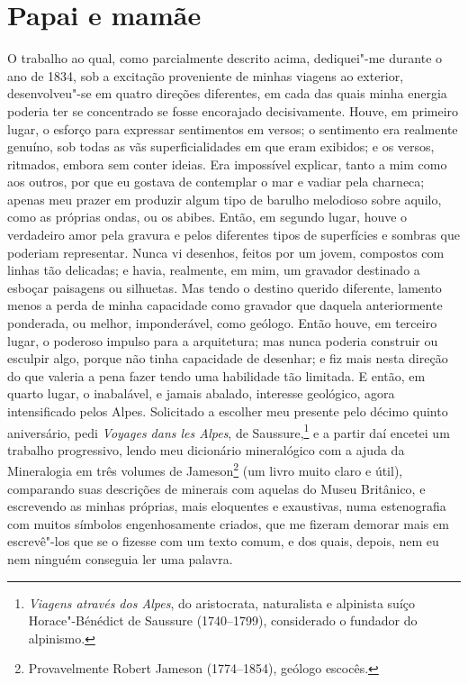 \chapter{Papai e mamãe} %

O trabalho ao qual, como parcialmente descrito acima, dediquei"-me \label{139}
durante o ano de 1834, sob a excitação proveniente de minhas viagens ao
exterior, desenvolveu"-se em quatro direções diferentes, em cada das
quais minha energia poderia ter se concentrado se fosse encorajado
decisivamente. Houve, em primeiro lugar, o esforço para expressar
sentimentos em versos; o sentimento era realmente genuíno, sob todas as
vãs superficialidades em que eram exibidos; e os versos, ritmados,
embora sem conter ideias. Era impossível explicar, tanto a mim como aos
outros, por que eu gostava de contemplar o mar e vadiar pela charneca;
apenas meu prazer em produzir algum tipo de barulho melodioso sobre
aquilo, como as próprias ondas, ou os abibes. Então, em segundo lugar,
houve o verdadeiro amor pela gravura e pelos diferentes tipos de
superfícies e sombras que poderiam representar. Nunca vi desenhos,
feitos por um jovem, compostos com linhas tão delicadas; e havia,
realmente, em mim, um gravador destinado a esboçar paisagens ou
silhuetas. Mas tendo o destino querido diferente, lamento menos a perda
de minha capacidade como gravador que daquela anteriormente ponderada,
ou melhor, imponderável, como geólogo. Então houve, em terceiro lugar, o
poderoso impulso para a arquitetura; mas nunca poderia construir ou
esculpir algo, porque não tinha capacidade de desenhar; e fiz mais nesta
direção do que valeria a pena fazer tendo uma habilidade tão limitada. E
então, em quarto lugar, o inabalável, e jamais abalado, interesse
geológico, agora intensificado pelos Alpes. Solicitado a escolher meu
presente pelo décimo quinto aniversário, pedi \textit{Voyages dans les
Alpes}, de Saussure,\footnote{\textit{Viagens através dos Alpes}, do
  aristocrata, naturalista e alpinista suíço Horace"-Bénédict de Saussure
  (1740--1799), considerado o fundador do alpinismo.} e a
partir daí encetei um trabalho progressivo, lendo meu dicionário
mineralógico com a ajuda da Mineralogia em três volumes de
Jameson\footnote{Provavelmente Robert Jameson (1774--1854), geólogo
  escocês.} (um livro muito claro e útil), comparando
suas descrições de minerais com aquelas do Museu Britânico, e escrevendo
as minhas próprias, mais eloquentes e exaustivas, numa estenografia com
muitos símbolos engenhosamente criados, que me fizeram demorar mais em
escrevê"-los que se o fizesse com um texto comum, e dos quais, depois,
nem eu nem ninguém conseguia ler uma palavra.

